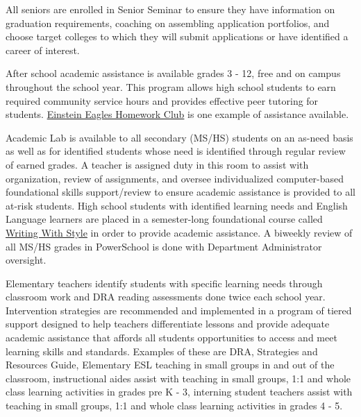 \begin{findings}
All seniors are enrolled in Senior Seminar to ensure they have information on graduation requirements, coaching on assembling application portfolios, and choose target colleges to which they will submit applications or have identified a career of interest.

After school academic assistance is available grades 3 - 12, free and on campus throughout the school year. This program allows high school students to earn required community service hours and provides effective peer tutoring for students.  \href{http://blogs.cmis.ac.th/newsletter/2015/09/17/einstein-eagles-starts-monday-get-involved/}{Einstein Eagles Homework Club} is one example of assistance available.

Academic Lab is available to all secondary (MS/HS) students on an as-need basis as well as for identified students whose need is identified through regular review of earned grades. A teacher is assigned duty in this room to assist with organization, review of assignments, and oversee individualized computer-based foundational skills support/review to ensure academic assistance is provided to all at-risk students. High school students with identified learning needs and English Language learners are placed in a semester-long foundational course called \href{https://drive.google.com/open?id=100aj_4W2p7cnSRhdpkEhTtGRoBIBMe6Uy8JgKBVyofk}{Writing With Style} in order to provide academic assistance. A biweekly review of all MS/HS grades in PowerSchool is done with Department Administrator oversight.

Elementary teachers identify students with specific learning needs through classroom work and DRA reading assessments done twice each school year. Intervention strategies are recommended and implemented in a program of tiered support designed to help teachers differentiate lessons and provide adequate academic assistance that affords all students opportunities to access and meet learning skills and standards. Examples of these are DRA, Strategies and Resources Guide, Elementary ESL teaching in small groups in and out of the classroom, instructional aides assist with teaching in small groups, 1:1 and whole class learning activities in grades pre K - 3, interning student teachers assist with teaching in small groups, 1:1 and whole class learning activities in grades 4 - 5. 


\end{findings}
